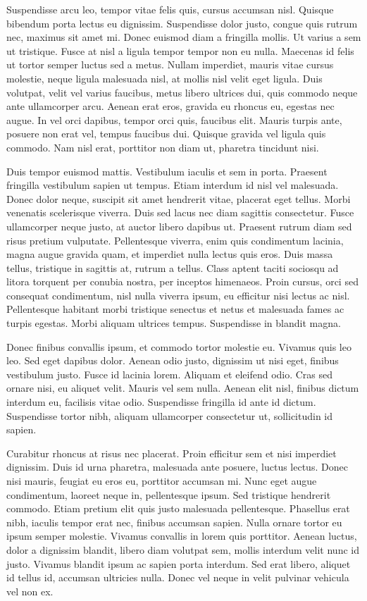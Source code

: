 \documentclass{homework}
\begin{document}
Suspendisse arcu leo, tempor vitae felis quis, cursus accumsan nisl. Quisque bibendum porta lectus eu dignissim. Suspendisse dolor justo, congue quis rutrum nec, maximus sit amet mi. Donec euismod diam a fringilla mollis. Ut varius a sem ut tristique. Fusce at nisl a ligula tempor tempor non eu nulla. Maecenas id felis ut tortor semper luctus sed a metus. Nullam imperdiet, mauris vitae cursus molestie, neque ligula malesuada nisl, at mollis nisl velit eget ligula. Duis volutpat, velit vel varius faucibus, metus libero ultrices dui, quis commodo neque ante ullamcorper arcu. Aenean erat eros, gravida eu rhoncus eu, egestas nec augue. In vel orci dapibus, tempor orci quis, faucibus elit. Mauris turpis ante, posuere non erat vel, tempus faucibus dui. Quisque gravida vel ligula quis commodo. Nam nisl erat, porttitor non diam ut, pharetra tincidunt nisi.

Duis tempor euismod mattis. Vestibulum iaculis et sem in porta. Praesent fringilla vestibulum sapien ut tempus. Etiam interdum id nisl vel malesuada. Donec dolor neque, suscipit sit amet hendrerit vitae, placerat eget tellus. Morbi venenatis scelerisque viverra. Duis sed lacus nec diam sagittis consectetur. Fusce ullamcorper neque justo, at auctor libero dapibus ut. Praesent rutrum diam sed risus pretium vulputate. Pellentesque viverra, enim quis condimentum lacinia, magna augue gravida quam, et imperdiet nulla lectus quis eros. Duis massa tellus, tristique in sagittis at, rutrum a tellus. Class aptent taciti sociosqu ad litora torquent per conubia nostra, per inceptos himenaeos. Proin cursus, orci sed consequat condimentum, nisl nulla viverra ipsum, eu efficitur nisi lectus ac nisl. Pellentesque habitant morbi tristique senectus et netus et malesuada fames ac turpis egestas. Morbi aliquam ultrices tempus. Suspendisse in blandit magna.

Donec finibus convallis ipsum, et commodo tortor molestie eu. Vivamus quis leo leo. Sed eget dapibus dolor. Aenean odio justo, dignissim ut nisi eget, finibus vestibulum justo. Fusce id lacinia lorem. Aliquam et eleifend odio. Cras sed ornare nisi, eu aliquet velit. Mauris vel sem nulla. Aenean elit nisl, finibus dictum interdum eu, facilisis vitae odio. Suspendisse fringilla id ante id dictum. Suspendisse tortor nibh, aliquam ullamcorper consectetur ut, sollicitudin id sapien.

Curabitur rhoncus at risus nec placerat. Proin efficitur sem et nisi imperdiet dignissim. Duis id urna pharetra, malesuada ante posuere, luctus lectus. Donec nisi mauris, feugiat eu eros eu, porttitor accumsan mi. Nunc eget augue condimentum, laoreet neque in, pellentesque ipsum. Sed tristique hendrerit commodo. Etiam pretium elit quis justo malesuada pellentesque. Phasellus erat nibh, iaculis tempor erat nec, finibus accumsan sapien. Nulla ornare tortor eu ipsum semper molestie. Vivamus convallis in lorem quis porttitor. Aenean luctus, dolor a dignissim blandit, libero diam volutpat sem, mollis interdum velit nunc id justo. Vivamus blandit ipsum ac sapien porta interdum. Sed erat libero, aliquet id tellus id, accumsan ultricies nulla. Donec vel neque in velit pulvinar vehicula vel non ex.
\end{document}
